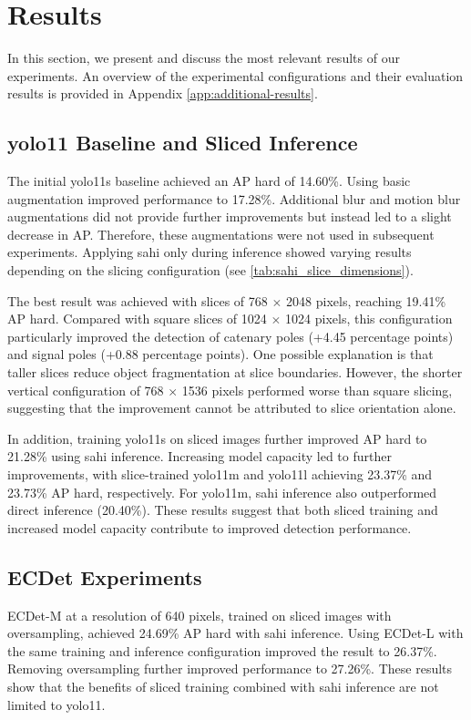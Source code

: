 \section{Results}
In this section, we present and discuss the most relevant results of our experiments. An  overview of the experimental configurations and their evaluation results is provided in Appendix \ref{app:additional-results}.
\subsection{\acrshort{yolo}11 Baseline and Sliced Inference}
The initial \acrshort{yolo}11s baseline achieved an AP hard of 14.60\%. Using basic augmentation improved performance to 17.28\%. Additional blur and motion blur augmentations did not provide further improvements but instead led to a slight decrease in AP. Therefore, these augmentations were not used in subsequent experiments. Applying \acrshort{sahi} only during inference showed varying results depending on the slicing configuration (see \cref{tab:sahi_slice_dimensions}).





The best result was achieved with slices of 768 $\times$ 2048 pixels, reaching 19.41\% AP hard. Compared with square slices of 1024 $\times$ 1024 pixels, this configuration particularly improved the detection of catenary poles (+4.45 percentage points) and signal poles (+0.88 percentage points). One possible explanation is that taller slices reduce object fragmentation at slice boundaries. However, the shorter vertical configuration of 768 $\times$ 1536 pixels performed worse than square slicing, suggesting that the improvement cannot be attributed to slice orientation alone.

In addition, training \acrshort{yolo}11s on sliced images further improved AP hard to 21.28\% using \acrshort{sahi} inference. Increasing model capacity led to further improvements, with slice-trained \acrshort{yolo}11m and \acrshort{yolo}11l achieving 23.37\% and 23.73\% AP hard, respectively. For \acrshort{yolo}11m, \acrshort{sahi} inference also outperformed direct inference (20.40\%). These results suggest that both sliced training and increased model capacity contribute to improved detection performance.

\subsection{ECDet Experiments}
ECDet-M at a resolution of 640 pixels, trained on sliced images with oversampling, achieved 24.69\% AP hard with \acrshort{sahi} inference. Using ECDet-L with the same training and inference configuration improved the result to 26.37\%. Removing oversampling further improved performance to 27.26\%. These results show that the benefits of sliced training combined with \acrshort{sahi} inference are not limited to \acrshort{yolo}11.

